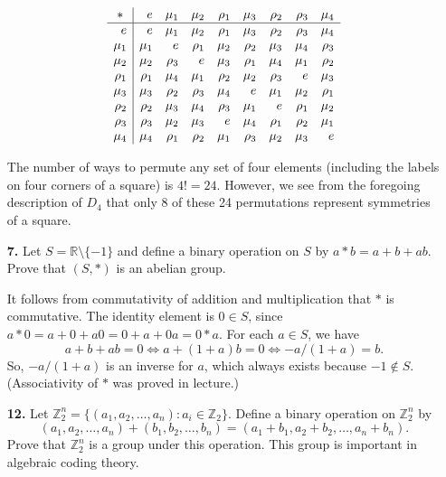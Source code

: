\documentclass[12pt,reqno]{amsart}
\newcommand{\<}{\ensuremath{\langle}}
\renewcommand{\>}{\ensuremath{\rangle}}
\begin{document}
\begin{enumerate}
\[
\begin{array}{r|*{8}{r}}
\multicolumn{1}{c|}{\ast}&e&\mu_1&\mu_2&\rho_1&\mu_3&\rho_2&\rho_3&\mu_4\\\hline
{}e&e&\mu_1&\mu_2&\rho_1&\mu_3&\rho_2&\rho_3&\mu_4\\
{}\mu_1&\mu_1&e&\rho_1&\mu_2&\rho_2&\mu_3&\mu_4&\rho_3\\
{}\mu_2&\mu_2&\rho_3&e&\mu_3&\rho_1&\mu_4&\mu_1&\rho_2\\
{}\rho_1&\rho_1&\mu_4&\mu_1&\rho_2&\mu_2&\rho_3&e&\mu_3\\
{}\mu_3&\mu_3&\rho_2&\rho_3&\mu_4&e&\mu_1&\mu_2&\rho_1\\
{}\rho_2&\rho_2&\mu_3&\mu_4&\rho_3&\mu_1&e&\rho_1&\mu_2\\
{}\rho_3&\rho_3&\mu_2&\mu_3&e&\mu_4&\rho_1&\rho_2&\mu_1\\
{}\mu_4&\mu_4&\rho_1&\rho_2&\mu_1&\rho_3&\mu_2&\mu_3&e\\
\end{array}
\]

\medskip

The number of ways to permute any set of four elements (including the labels on
four corners of a square) is $4! = 24$. However, we see from the foregoing
description of $D_4$ that only 8 of these 24 permutations represent symmetries
of a square.


\newpage

\item[{\bf 7.}]
Let $S = {\mathbb R} \setminus \{ -1 \}$ and define a binary operation on
$S$ by $a \ast b = a + b +ab$. Prove that $(S, \ast)$ is an abelian
group.
 

\medskip

It follows from commutativity of addition and multiplication that $*$ is
commutative.
The identity element is $0\in S$, since $a*0 = a+0+ a0 = 0+a+ 0a =0*a$.
For each $a\in S$, we have 
\[
a + b + ab = 0 \Leftrightarrow a + (1+a)b = 0
\Leftrightarrow -a/(1+a)= b.
\]
So, $-a/(1+a)$ is an inverse for $a$, which always exists because $-1\notin S$.
(Associativity of $*$ was proved in lecture.)

\medskip

\item[{\bf 12.}]
Let ${\mathbb Z}_2^n = \{ (a_1, a_2, \ldots, a_n) : a_i \in {\mathbb Z}_2
\}$. Define a binary operation on ${\mathbb Z}_2^n$ by
\[
(a_1, a_2, \ldots, a_n)
+
(b_1, b_2, \ldots, b_n)
=
(a_1+b_1, a_2+b_2, \ldots, a_n+b_n).
\]
Prove that ${\mathbb Z}_2^n$ is a group under this operation. This group
is important in algebraic coding theory. 
 

\end{enumerate}
\end{document}
